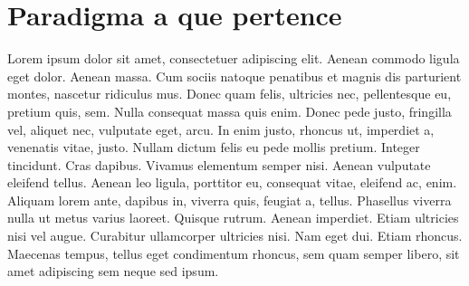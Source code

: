 \chapter{Paradigma a que pertence}

    Lorem ipsum dolor sit amet, consectetuer adipiscing 
    elit. Aenean commodo ligula eget dolor. Aenean massa.
    Cum sociis natoque penatibus et magnis dis parturient
    montes, nascetur ridiculus mus. Donec quam felis, 
    ultricies nec, pellentesque eu, pretium quis, sem. 
    Nulla consequat massa quis enim. Donec pede justo, 
    fringilla vel, aliquet nec, vulputate eget, arcu. In 
    enim justo, rhoncus ut, imperdiet a, venenatis vitae,
    justo. Nullam dictum felis eu pede mollis pretium. 
    Integer tincidunt. Cras dapibus. Vivamus elementum 
    semper nisi. Aenean vulputate eleifend tellus. Aenean 
    leo ligula, porttitor eu, consequat vitae, eleifend 
    ac, enim. Aliquam lorem ante, dapibus in, viverra 
    quis, feugiat a, tellus. Phasellus viverra nulla ut 
    metus varius laoreet. Quisque rutrum. Aenean imperdiet.
    Etiam ultricies nisi vel augue. Curabitur ullamcorper 
    ultricies nisi. Nam eget dui. Etiam rhoncus. Maecenas 
    tempus, tellus eget condimentum rhoncus, sem quam 
    semper libero, sit amet adipiscing sem neque sed ipsum.

    \nocite{haskellslides}
    \nocite{funcoespura}
    \nocite{funcoespura2}
    \nocite{haskellwikipedia}
    \nocite{abntex2-wiki-como-customizar}


    \newpage